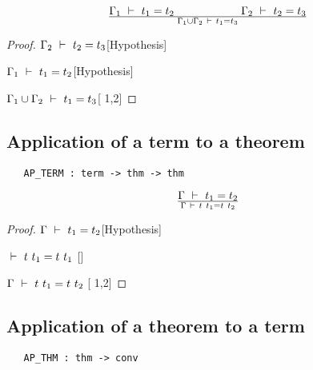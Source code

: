 \vspace{12pt plus2pt minus1pt}

$$\Gamma_1\ \vdash\  t_1=t_2\qquad\qquad\qquad \Gamma_2\ \vdash\  t_2=t_3 \over
\Gamma_1\cup\Gamma_2\ \vdash\  t_1=t_3$$

\vspace{12pt plus2pt minus1pt}

\begin{proof}
\item $\Gamma_2\ \vdash\  t_2=t_3$\hfill [Hypothesis]
\item $\Gamma_1\ \vdash\  t_1=t_2$\hfill [Hypothesis]
\item $\Gamma_1\cup\Gamma_2\ \vdash\  t_1=t_3$\hfill [ 1,2]
\end{proof}



\subsection{Application of a term to a theorem}%

\begin{holboxed}
\begin{verbatim}
   AP_TERM : term -> thm -> thm
\end{verbatim}\end{holboxed}

\vspace{12pt plus2pt minus1pt}

$$\Gamma\turn t_1=t_2\over\Gamma\turn t\ t_1 = t\ t_2$$

\vspace{12pt plus2pt minus1pt}

\begin{proof}
\item $\Gamma\ \vdash\  t_1=t_2$\hfill [Hypothesis]
\item $\ \vdash\  t\ t_1 = t\ t_1$ \hfill []
\item $\Gamma\ \vdash\  t\ t_1 = t\ t_2$ \hfill [ 1,2]
\end{proof}



\subsection{Application of a theorem to a term}

\begin{holboxed}
\begin{verbatim}
   AP_THM : thm -> conv
\end{verbatim}\end{holboxed}

